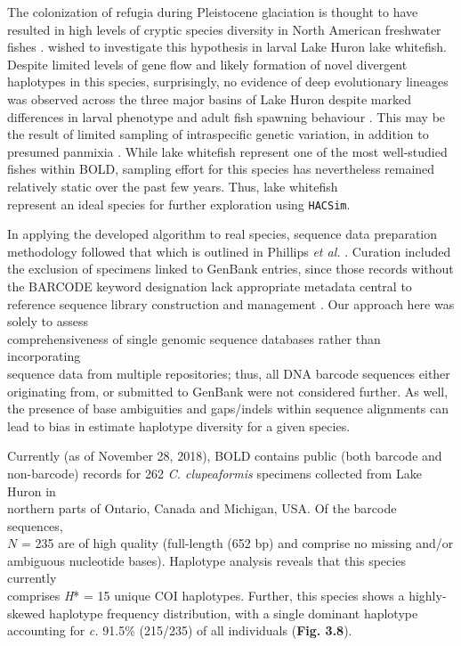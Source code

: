The colonization of refugia during Pleistocene glaciation is thought to have resulted in high levels of cryptic species diversity in North American freshwater fishes \cite{april2013glacial, april2013metabolic, april2011genetic, hubert2008identifying}. \cite{overdyk2015extending} wished to investigate this hypothesis in larval Lake Huron lake whitefish. Despite limited levels of gene flow and likely formation of novel divergent haplotypes in this species, surprisingly, no evidence of deep evolutionary lineages was observed across the three major basins of Lake Huron despite marked differences in larval phenotype and adult fish spawning behaviour \cite{overdyk2015extending}. This may be the result of limited sampling of intraspecific genetic variation, in addition to presumed panmixia \cite{overdyk2015extending}. While lake whitefish represent one of the most well-studied fishes within BOLD, sampling effort for this species has nevertheless remained relatively static over the past few years. Thus, lake whitefish \\ represent an ideal species for further exploration using {\tt HACSim}. 

In applying the developed algorithm to real species, sequence data preparation \\ methodology followed that which is outlined in Phillips \textit{et al.} \cite{phillips2015exploration}. Curation included the exclusion of specimens linked to GenBank entries, since those records without the BARCODE keyword designation lack appropriate metadata central to reference sequence library construction and management \cite{hanner2009data}. Our approach here was solely to assess \\ comprehensiveness of single genomic sequence databases rather than incorporating \\ sequence data from multiple repositories; thus, all DNA barcode sequences either \\ originating from, or submitted to GenBank were not considered further. As well, the presence of base ambiguities and gaps/indels within sequence alignments can lead to bias in estimate haplotype diversity for a given species.

Currently (as of November 28, 2018), BOLD contains public (both barcode and \\ non-barcode) records for 262 \textit{C. clupeaformis} specimens collected from Lake Huron in \\ northern parts of Ontario, Canada and Michigan, USA. Of the barcode sequences, \\ $N$ = 235 are of high quality (full-length (652 bp) and comprise no missing and/or \\ ambiguous nucleotide bases). Haplotype analysis reveals that this species currently \\ comprises \textit{H}* = 15 unique COI haplotypes. Further, this species shows a highly-skewed haplotype frequency distribution, with a single dominant haplotype accounting for \textit{c.} 91.5\% (215/235) of all individuals (\textbf{Fig. 3.8}). 


